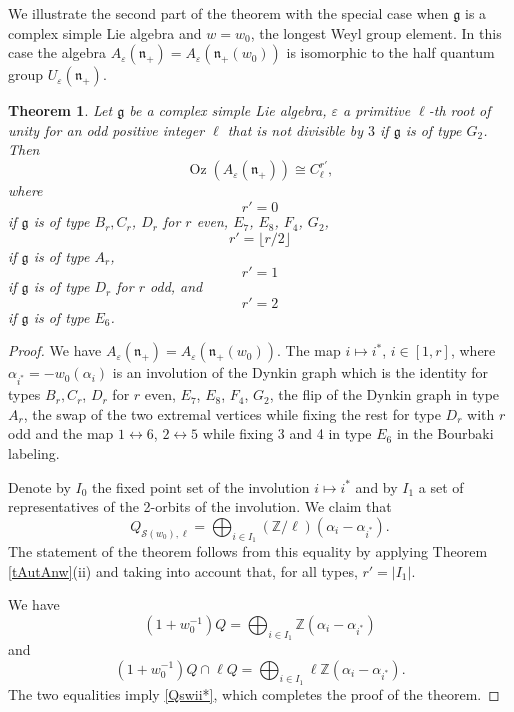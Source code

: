 \documentclass[11pt]{amsart}
\theoremstyle{plain}
\newtheorem{theorem}{Theorem}[section]
\newcommand \bth[1] { \begin{theorem}\label{t#1} }
\renewcommand {\eth} { \end{theorem} }
\newcommand \thref[1]{Theorem \ref{t#1}}
\def \Zset {{\mathbb Z}}
\def \SS {{\mathcal{S}}}
\def \al {\alpha}
\def \ep {\varepsilon}
\def \mt  {\mapsto}
\def \g  {\mathfrak{g}}   %
\def \n  {\mathfrak{n}}
\DeclareMathOperator \Oz { {\mathrm{Oz}}}
\begin{document}
We illustrate the second part of the theorem with the special case when $\g$ is a complex simple Lie algebra and $w=w_0$, the longest Weyl group element. In this case the algebra $A_\ep(\n_+)= A_\ep(\n_+(w_0))$ 
is isomorphic to the half quantum group $U_\ep(\n_+)$. 
\bth{complex} Let $\g$ be a complex simple Lie algebra, $\ep$ a primitive $\ell$-th root of unity for an odd positive integer $\ell$ that is not divisible by $3$ if $\g$ is of type $G_2$. Then 
\[
\Oz(A_\ep(\n_+)) \cong C_\ell^{r'},   
\]
where
\[
r' = 0
\]
if $\g$ is of type $B_r, C_r$, $D_r$ for $r$ even, $E_7$, $E_8$, $F_4$, $G_2$, 
\[
r' = \lfloor r/2 \rfloor
\]
if $\g$ is of type $A_r$, 
\[
r' = 1
\]
if $\g$ is of type $D_r$ for $r$ odd, and 
\[
r' = 2
\]
if $\g$ is of type $E_6$. 
\eth
\begin{proof} We have $A_\ep(\n_+) = A_\ep(\n_+(w_0))$. The map $i \mt i^*$, $i \in [1,r]$, where 
$\al_{i^*} = - w_0(\al_i)$ is an involution of the Dynkin graph which is the 
identity for types $B_r, C_r$, $D_r$ for $r$ even, $E_7$, $E_8$, $F_4$, $G_2$, the flip of the Dynkin graph in type $A_r$, the swap of the two extremal vertices while fixing the rest for type $D_r$ with $r$ odd and the map $1 \leftrightarrow 6$, 
$2 \leftrightarrow 5$ while fixing 3 and 4 in type $E_6$ in the Bourbaki labeling. 

Denote by $I_0$ the fixed point set of the involution $i \mt i^*$ and by $I_1$ a set of representatives of the 2-orbits of the involution. We claim that
\begin{equation}
\label{Qswii*}
Q_{\SS(w_0), \ell} = \bigoplus_{i \in I_1} (\Zset/\ell) (\al_i - \al_{i^*}).
\end{equation}
The statement of the theorem follows from this equality by applying 
\thref{AutAnw}(ii) and taking into account that, for all types, 
$r'=|I_1|$.

We have 
\[
(1 + w_0^{-1}) Q = \bigoplus_{i \in I_1} \Zset (\al_i - \al_{i^*})
\]
and 
\[
(1 + w_0^{-1}) Q \cap \ell Q = \bigoplus_{i \in I_1} \ell \Zset (\al_i - \al_{i^*}).
\]
The two equalities imply \eqref{Qswii*}, which completes the proof of the theorem. 
\end{proof}
\end{document}
